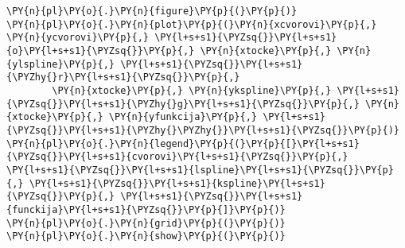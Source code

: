 \begin{Verbatim}[commandchars=\\\{\}]
\PY{n}{pl}\PY{o}{.}\PY{n}{figure}\PY{p}{(}\PY{p}{)}
\PY{n}{pl}\PY{o}{.}\PY{n}{plot}\PY{p}{(}\PY{n}{xcvorovi}\PY{p}{,} \PY{n}{ycvorovi}\PY{p}{,} \PY{l+s+s1}{\PYZsq{}}\PY{l+s+s1}{o}\PY{l+s+s1}{\PYZsq{}}\PY{p}{,} \PY{n}{xtocke}\PY{p}{,} \PY{n}{ylspline}\PY{p}{,} \PY{l+s+s1}{\PYZsq{}}\PY{l+s+s1}{\PYZhy{}r}\PY{l+s+s1}{\PYZsq{}}\PY{p}{,}
        \PY{n}{xtocke}\PY{p}{,} \PY{n}{ykspline}\PY{p}{,} \PY{l+s+s1}{\PYZsq{}}\PY{l+s+s1}{\PYZhy{}g}\PY{l+s+s1}{\PYZsq{}}\PY{p}{,} \PY{n}{xtocke}\PY{p}{,} \PY{n}{yfunkcija}\PY{p}{,} \PY{l+s+s1}{\PYZsq{}}\PY{l+s+s1}{\PYZhy{}\PYZhy{}}\PY{l+s+s1}{\PYZsq{}}\PY{p}{)}
\PY{n}{pl}\PY{o}{.}\PY{n}{legend}\PY{p}{(}\PY{p}{[}\PY{l+s+s1}{\PYZsq{}}\PY{l+s+s1}{cvorovi}\PY{l+s+s1}{\PYZsq{}}\PY{p}{,} \PY{l+s+s1}{\PYZsq{}}\PY{l+s+s1}{lspline}\PY{l+s+s1}{\PYZsq{}}\PY{p}{,} \PY{l+s+s1}{\PYZsq{}}\PY{l+s+s1}{kspline}\PY{l+s+s1}{\PYZsq{}}\PY{p}{,} \PY{l+s+s1}{\PYZsq{}}\PY{l+s+s1}{funckija}\PY{l+s+s1}{\PYZsq{}}\PY{p}{]}\PY{p}{)}
\PY{n}{pl}\PY{o}{.}\PY{n}{grid}\PY{p}{(}\PY{p}{)}
\PY{n}{pl}\PY{o}{.}\PY{n}{show}\PY{p}{(}\PY{p}{)}
\end{Verbatim}
